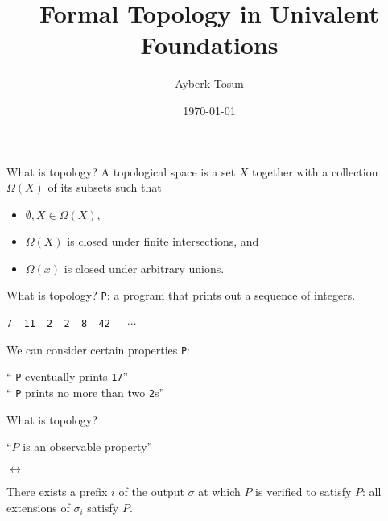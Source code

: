 \documentclass[xcolor={dvipsnames}]{beamer}
\title{Formal Topology in Univalent Foundations}
\date{\today}
\author{Ayberk Tosun}
\institute{Chalmers University of Technology}
\newcommand{\fnname}[1]{{\color{codecolour} {\tt #1}}}
\newcommand{\prgoutput}[1]{{\color{codecolour} {\tt #1}}}
\begin{document}
\maketitle

\begin{frame}{What is topology?}
  \Large
  A topological space is a set $X$ together with a collection $\Omega(X)$ of its subsets
  such that
  \begin{itemize}
    \item $\emptyset, X \in \Omega(X)$,
    \item $\Omega(X)$ is closed under \alert{finite} intersections, and
    \item $\Omega(x)$ is closed under \alert{arbitrary} unions.
  \end{itemize}
\end{frame}

\begin{frame}{What is topology?}
  \Large
  \fnname{P}: a program that prints out a sequence of integers.
  \vspace{1em}
  \begin{center}
  \prgoutput{7~~11~~2~~2~~8~~42~~}~$\cdots$
  \end{center}
  \vspace{1em}
  We can consider certain properties \fnname{P}:
  \begin{center}
    ``\fnname{P} eventually prints \fnname{17}''\\
    \vspace{1em}
    ``\fnname{P} prints no more than two \fnname{2}s''
  \end{center}
\end{frame}

\begin{frame}{What is topology?}
  \Large
  \begin{center}
    ``$P$ is an \alert{observable property}''

    \vspace{2em}
    $\leftrightarrow$
    \vspace{2em}

    There exists a prefix $i$ of the output $\sigma$ at which $P$ is \alert{verified} to
    satisfy $P$: all extensions of $\sigma_i$ satisfy $P$.
  \end{center}
\end{frame}
\end{document}
